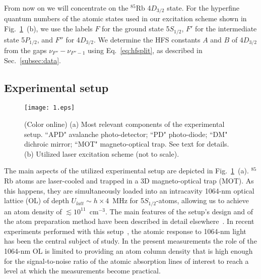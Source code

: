 \documentclass[reprint, amsmath,amssymb, aps, pra, longbibliography]{revtex4-1}
\begin{document}
From now on we will concentrate on the $^{85}$Rb 4$D_{3/2}$ state. For the hyperfine quantum numbers of the atomic states used in our excitation scheme shown in  Fig.~\ref{fig1}~(b), we use the labels $F$ for the ground state 5$S_{1/2}$, $F'$ for the intermediate state 5$P_{1/2}$, and $F''$ for 4$D_{3/2}$. 
We determine the HFS constants $A$ and $B$ of 4$D_{3/2}$ from the gaps $\nu_{F''}-\nu_{F''-1}$ using Eq.~\ref{eq:hfsplit}, as described in Sec.~\ref{subsec:data}.


\subsection{Experimental setup}
\label{subsec:expsetup}

\begin{figure}[t!]
 \centering
  \texttt{[image: 1.eps]}
  \caption{(Color online) (a) Most relevant components of 
  the experimental setup. ``APD" avalanche photo-detector; ``PD" photo-diode; ``DM" dichroic mirror;
  ``MOT" magneto-optical trap. See text for details.
  (b) Utilized laser excitation scheme (not to scale). } 
  \label{fig1}
\end{figure}

The main aspects of the utilized experimental setup are depicted in Fig.~\ref{fig1}~(a). $^{85}$Rb atoms are laser-cooled and trapped in a 3D magneto-optical trap (MOT). As this happens, they are simultaneously loaded into an intracavity 1064-nm optical lattice (OL) of depth $U_{latt} \sim h \times 4$~MHz for 5$S_{1/2}$-atoms, allowing us to achieve an atom density of $\lesssim 10^{11}$~cm$^{-3}$. The main features of the setup's design and of the atom preparation method have been described in detail elsewhere~\cite{Chen2014praatomtrapping}. In recent experiments performed with this setup~\cite{cardman2021,atoms10040117}, the atomic response to 1064-nm light has been the central subject of study. In the present measurements the role of the 1064-nm OL is limited to providing an atom column density that is high enough for the signal-to-noise ratio of the atomic absorption lines of interest to reach a level at which the measurements become practical.
\end{document}

